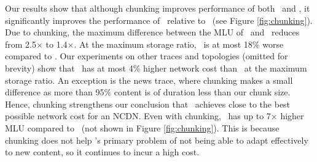 
Our results show that  although chunking improves performance of both \invlru\ and \optrpfuture, it significantly improves the performance of \invlru\ relative to \optrpfuture\ (see Figure \ref{fig:chunking}).  Due to chunking, the maximum difference between the MLU of  \invlru\ and \optrpfuture\ reduces from 2.5$\times$ to 1.4$\times$. At the maximum storage ratio, \invlru\ is at most 18\% worse compared to \optrpfuture. Our experiments on other traces and topologies (omitted for brevity)  show that \invlru\ has at most 4\% higher network cost than \optrpfuture\ at the maximum storage ratio. An exception is  the news trace, where chunking makes a small difference as  more than 95\% content is of duration less than our chunk size.  Hence, chunking strengthens our conclusion that \invlru\ achieves close to the best possible network cost for an NCDN. Even with chunking,  \optrp\ has up to 7$\times$ higher MLU compared to \invlru\ (not shown in Figure \ref{fig:chunking}). This is because chunking does not help \optrp's primary problem of not being able to adapt effectively to new content, so it continues to incur a high cost.



